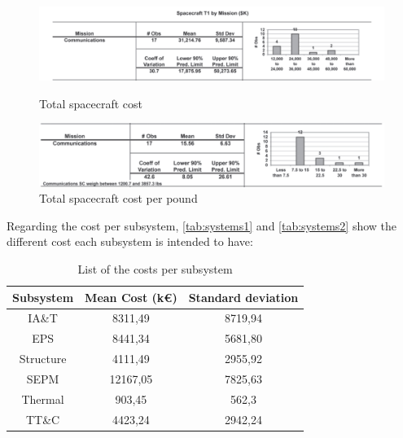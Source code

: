 \documentclass[11pt,a4paper,titlepage]{article}
\begin{document}
		\begin{figure}
			\centering
			\begin{minipage}{1\textwidth}
			\centering
			\includegraphics[width = .95\textwidth]{mission.png}
			\caption{Total spacecraft cost}
			\label{fig:mission}
			\end{minipage}
			\hspace{20mm}
			\begin{minipage}{.95\textwidth}
			\centering
			\includegraphics[width = .95\textwidth]{mission_pound.png}
			\caption{Total spacecraft cost per pound}
			\label{fig:mission_pound}
			\end{minipage}
		\end{figure}
		
		Regarding the cost per subsystem, \autoref{tab:systems1} and \autoref{tab:systems2} show the different cost each 				subsystem is intended to have:
		
		\begin{table}
			\centering
			\begin{tabular}{ccc}
			\toprule
			Subsystem & Mean Cost (k\euro) & Standard deviation\\
			\midrule
			IA\&T     & 8311,49   & 8719,94\\
			EPS        & 8441,34   & 5681,80\\
			Structure & 4111,49   & 2955,92\\
			SEPM      & 12167,05 & 7825,63\\
			Thermal  & 903,45    & 562,3\\
			TT\&C    & 4423,24   & 2942,24\\ 
			\bottomrule
			\end{tabular}
			\caption{List of the costs per subsystem}
			\label{tab:systems1}
		\end{table}
		
\end{document}
